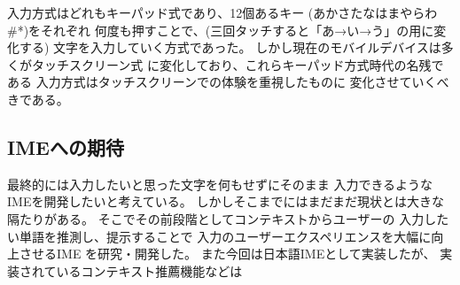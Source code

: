 入力方式はどれもキーパッド式であり、12個あるキー
(あかさたなはまやらわ\#*)をそれぞれ
何度も押すことで、(三回タッチすると「あ→い→う」の用に変化する)
文字を入力していく方式であった。
しかし現在のモバイルデバイスは多くがタッチスクリーン式
に変化しており、これらキーパッド方式時代の名残である
入力方式はタッチスクリーンでの体験を重視したものに
変化させていくべきである。\cite{designinginterface}

\subsection{IMEへの期待}
最終的には入力したいと思った文字を何もせずにそのまま
入力できるようなIMEを開発したいと考えている。
しかしそこまでにはまだまだ現状とは大きな隔たりがある。
そこでその前段階としてコンテキストからユーザーの
入力したい単語を推測し、提示することで
入力のユーザーエクスペリエンスを大幅に向上させるIME
を研究・開発した。
また今回は日本語IMEとして実装したが、
実装されているコンテキスト推薦機能などは

